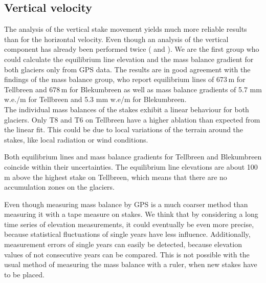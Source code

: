 \subsection{Vertical velocity}

The analysis of the vertical stake movement yields much more reliable results than for the horizontal velocity.
Even though an analysis of the vertical component has already been performed twice
(\cite{rep2016} and \cite{rep2017}).
We are the first group who could calculate the equilibrium line elevation and the mass balance gradient for
both glaciers only from GPS data.
The results are in good agreement with the findings of the mass balance group, who report equilibrium lines of
673\,m for Tellbreen and 678\,m for Blekumbreen as well as
mass balance gradients of 5.7 mm w.e./m for Tellbreen and 5.3 mm w.e/m for Blekumbreen.\\
The individual mass balances of the stakes exhibit a linear behaviour for both glaciers.
Only T8 and T6 on Tellbreen have a higher ablation than expected from the linear fit.
This could be due to local variations of the terrain around the stakes,
like local radiation or wind conditions.

Both equilibrium lines and mass balance gradients for Tellbreen and Blekumbreen coincide within their uncertainties.
The equilibrium line elevations are about 100\,m above the highest stake on Tellbreen,
which means that there are no accumulation zones on the glaciers.

Even though measuring mass balance by GPS is a much coarser method than measuring it with a tape measure on stakes.
We think that by considering a long time series of elevation measurements,
it could eventually be even more precise,
because statistical fluctuations of single years have less influence.
Additionally, measurement errors of single years can easily be detected,
because elevation values of not consecutive years can be compared.
This is not possible with the usual method of measuring the mass balance with a ruler,
when new stakes have to be placed.


